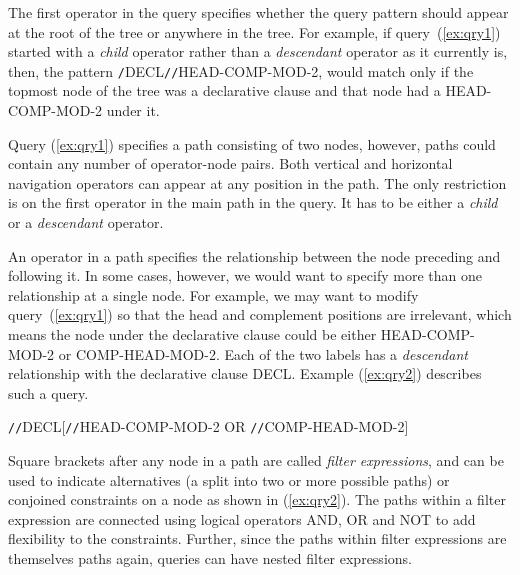 \documentclass[12pt]{article}
\begin{document}
The first operator in the query specifies whether the query pattern
should appear at the root of the tree or anywhere in the tree. For
example, if query~(\ref{ex:qry1}) started with a \emph{child} operator rather
than a \emph{descendant} operator as it currently is, then, the pattern 
{\small \verb=/=DECL\verb=//=HEAD-COMP-MOD-2}, would match only if the topmost 
node of the tree was a declarative clause and that node had a 
{\small HEAD-COMP-MOD-2} under it.

Query (\ref{ex:qry1}) specifies a path consisting of two nodes,
however, paths could contain any number of operator-node pairs. Both
vertical and horizontal navigation operators can appear at any
position in the path. The only restriction is on the first operator in
the main path in the query. It has to be either a \emph{child} or a
\emph{descendant} operator.

An operator in a path specifies the relationship between the node
preceding and following it. In some cases, however, we would want to
specify more than one relationship at a single node. For example, 
we may want to modify query~(\ref{ex:qry1}) so that the head and 
complement positions are irrelevant, which means the node under the
declarative clause could be either {\small HEAD-COMP-MOD-2} or 
COMP-HEAD-MOD-2. Each of the two labels has a \emph{descendant}
relationship with the declarative clause {\small DECL}. Example (\ref{ex:qry2})
describes such a query.

\begin{exe}
\ex\label{ex:qry2}\small
\verb=//=DECL[\verb=//=HEAD-COMP-MOD-2 OR \verb=//=COMP-HEAD-MOD-2]
\end{exe}

Square brackets after any node in a path are called {\it filter expressions},
and can be used to indicate alternatives (a split into two or more possible
paths) or conjoined constraints on a node as shown in (\ref{ex:qry2}). 
The paths within a filter expression are
connected using logical operators AND, OR and NOT to add
flexibility to the constraints.  Further, since the paths within
filter expressions are themselves paths again, queries can have nested
filter expressions.
\end{document}
